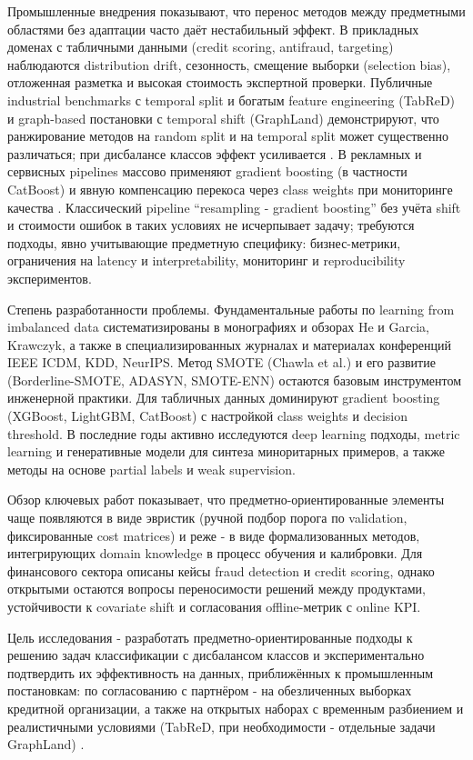 Промышленные внедрения показывают, что перенос методов между предметными областями без адаптации часто даёт нестабильный эффект. В прикладных доменах с табличными данными (credit scoring, antifraud, targeting) наблюдаются distribution drift, сезонность, смещение выборки (selection bias), отложенная разметка и высокая стоимость экспертной проверки. Публичные industrial benchmarks с temporal split и богатым feature engineering (TabReD) и graph-based постановки с temporal shift (GraphLand) демонстрируют, что ранжирование методов на random split и на temporal split может существенно различаться; при дисбалансе классов эффект усиливается \cite{rubachev2025tabred,bazhenov2025graphland}. В рекламных и сервисных pipelines массово применяют gradient boosting (в частности CatBoost) и явную компенсацию перекоса через class weights при мониторинге качества \cite{yandex2022habrdrift}. Классический pipeline ``resampling - gradient boosting'' без учёта shift и стоимости ошибок в таких условиях не исчерпывает задачу; требуются подходы, явно учитывающие предметную специфику: бизнес-метрики, ограничения на latency и interpretability, мониторинг и reproducibility экспериментов.

Степень разработанности проблемы. Фундаментальные работы по learning from imbalanced data систематизированы в монографиях и обзорах He и Garcia, Krawczyk, а также в специализированных журналах и материалах конференций IEEE ICDM, KDD, NeurIPS. Метод SMOTE (Chawla et al.) и его развитие (Borderline-SMOTE, ADASYN, SMOTE-ENN) остаются базовым инструментом инженерной практики. Для табличных данных доминируют gradient boosting (XGBoost, LightGBM, CatBoost) с настройкой class weights и decision threshold. В последние годы активно исследуются deep learning подходы, metric learning и генеративные модели для синтеза миноритарных примеров, а также методы на основе partial labels и weak supervision.

Обзор ключевых работ показывает, что предметно-ориентированные элементы чаще появляются в виде эвристик (ручной подбор порога по validation, фиксированные cost matrices) и реже - в виде формализованных методов, интегрирующих domain knowledge в процесс обучения и калибровки. Для финансового сектора описаны кейсы fraud detection и credit scoring, однако открытыми остаются вопросы переносимости решений между продуктами, устойчивости к covariate shift и согласования offline-метрик с online KPI.

Цель исследования - разработать предметно-ориентированные подходы к решению задач классификации с дисбалансом классов и экспериментально подтвердить их эффективность на данных, приближённых к промышленным постановкам: по согласованию с партнёром - на обезличенных выборках кредитной организации, а также на открытых наборах с временным разбиением и реалистичными условиями (TabReD, при необходимости - отдельные задачи GraphLand) \cite{rubachev2025tabred,bazhenov2025graphland}.

